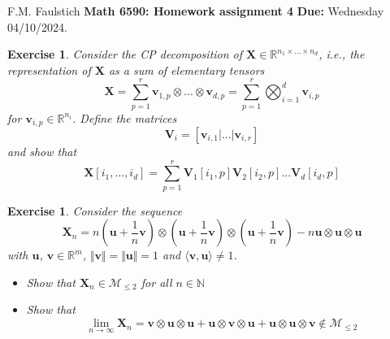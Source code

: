 \documentclass[11pt]{article}
\newcommand{\bvec}[1]{\mathbf{#1}}
\newcommand{\vu}{\bvec{u}}
\newcommand{\vv}{\bvec{v}}
\newcommand{\vV}{\bvec{V}}
\newcommand{\vX}{\bvec{X}}
\newtheorem{exercise}[theorem]{Exercise}
\begin{document}
\begin{flushleft}
F.M. Faulstich \hfill {\large\bf Math 6590: Homework assignment 4} \hfill {\bf Due:} Wednesday 04/10/2024.\\
\end{flushleft}


\begin{exercise}
Consider the CP decomposition of $\vX \in \mathbb{R}^{n_1 \times ... \times n_d}$, i.e., the representation of $\vX$ as a sum of elementary tensors
$$
\vX
=
\sum_{p=1}^r
\vv_{1,p} \otimes ... \otimes \vv_{d,p}
=
\sum_{p=1}^r \bigotimes_{i=1}^d \vv_{i,p}
$$
for $\vv_{i,p} \in \mathbb{R}^{n_i}$. Define the matrices
\begin{equation}
\vV_i 
=
[
\vv_{i,1}|...|\vv_{i,r}
]
\end{equation}
and show that 
\begin{equation}
\vX [i_1,...,i_d]
=
\sum_{p=1}^r
\vV_1[i_1,p] \vV_2[i_2,p] ... \vV_d[i_d,p]
\end{equation}

\end{exercise}


\begin{exercise}
Consider the sequence
$$
\vX_n
=n
\left(
\vu + \frac{1}{n} \vv
\right)
\otimes 
\left(
\vu + \frac{1}{n} \vv
\right)
\otimes 
\left(
\vu + \frac{1}{n} \vv
\right)
-
n \vu \otimes \vu \otimes \vu 
$$
with $\vu$, $\vv \in\mathbb{R}^m$, $\Vert \vv \Vert = \Vert \vu \Vert =1$ and $\langle \vv, \vu \rangle \neq 1$.\\
\begin{itemize}
\item[i)] Show that 
 $\vX_n \in \mathcal{M}_{\leq 2}$ for all $n\in\mathbb{N}$
\item[ii)] Show that 
$$
\lim_{n\to \infty} \vX_n 
=
\vv \otimes \vu \otimes \vu +
\vu \otimes \vv \otimes \vu +
\vu \otimes \vu \otimes \vv
\notin \mathcal{M}_{\leq 2}
$$
\end{itemize}
\end{exercise}
\end{document}
